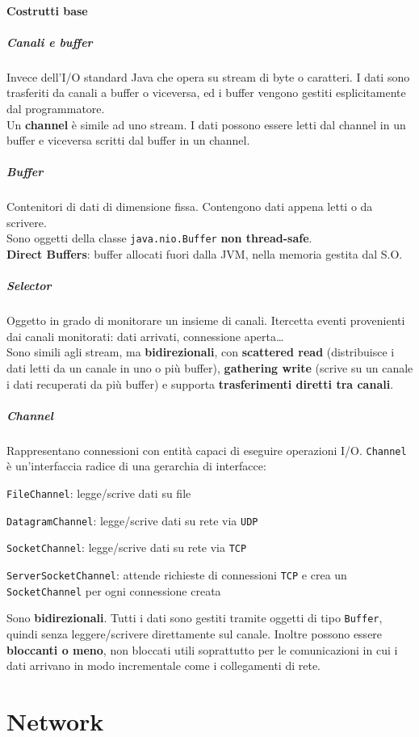 \documentclass[10pt]{article}
\begin{document}
\paragraph{Costrutti base}
\subparagraph{Canali e buffer} Invece dell'I/O standard Java che opera su stream di byte o caratteri. I dati sono trasferiti da canali a buffer o viceversa, ed i buffer vengono gestiti esplicitamente dal programmatore.\\
Un \textbf{channel} è simile ad uno stream. I dati possono essere letti dal channel in un buffer e viceversa scritti dal buffer in un channel.
\subparagraph{Buffer} Contenitori di dati di dimensione fissa. Contengono dati appena letti o da scrivere.\\
Sono oggetti della classe \texttt{java.nio.Buffer} \textbf{non thread-safe}.\\
\textbf{Direct Buffers}: buffer allocati fuori dalla JVM, nella memoria gestita dal S.O.
\subparagraph{Selector} Oggetto in grado di monitorare un insieme di canali. Itercetta eventi provenienti dai canali monitorati: dati arrivati, connessione aperta\ldots\\
Sono simili agli stream, ma \textbf{bidirezionali}, con \textbf{scattered read} (distribuisce i dati letti da un canale in uno o più buffer), \textbf{gathering write} (scrive su un canale i dati recuperati da più buffer) e supporta \textbf{trasferimenti diretti tra canali}.
\subparagraph{Channel} Rappresentano connessioni con entità capaci di eseguire operazioni I/O. \texttt{Channel} è un'interfaccia radice di una gerarchia di interfacce:
\begin{list}{}{}
	\item \texttt{FileChannel}: legge/scrive dati su file
	\item \texttt{DatagramChannel}: legge/scrive dati su rete via \texttt{UDP}
	\item \texttt{SocketChannel}: legge/scrive dati su rete via \texttt{TCP}
	\item \texttt{ServerSocketChannel}: attende richieste di connessioni \texttt{TCP} e crea un \texttt{SocketChannel} per ogni connessione creata
\end{list}
Sono \textbf{bidirezionali}. Tutti i dati sono gestiti tramite oggetti di tipo \texttt{Buffer}, quindi senza leggere/scrivere direttamente sul canale. Inoltre possono essere \textbf{bloccanti o meno}, non bloccati utili soprattutto per le comunicazioni in cui i dati arrivano in modo incrementale come i collegamenti di rete.
\section{Network}
\end{document}
